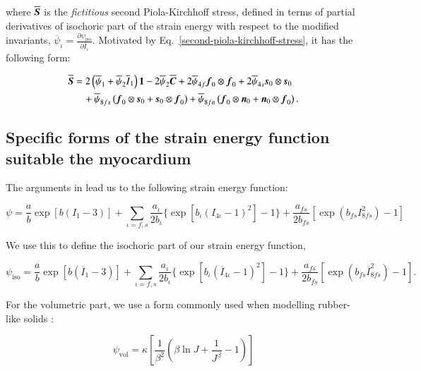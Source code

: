 \noindent where $\overline{\mbox{\boldmath$ S$}}$ is the {\em fictitious} second
Piola-Kirchhoff stress, defined in terms of partial derivatives of
isochoric part of the strain energy with respect to the modified
invariants, $\overline{\psi}_{\iota} = \frac{\partial
  \psi_{\mathrm{iso}}}{\partial \overline{I}_{\iota}}$. Motivated by
Eq.~\ref{second-piola-kirchhoff-stress}, it has the following form:

\begin{equation}
  \begin{split}
    \overline{\mbox{\boldmath$ S$}} &= 2 \left(\overline{\psi}_{1} + \overline{\psi}_{2} \overline{I}_{1} \right) {\bf 1}
                    - 2 \overline{\psi}_{2} \overline{\mbox{\boldmath$ C$}}
                    + 2 \overline{\psi}_{4f} \mbox{\boldmath$ f$}_{0}\otimes\mbox{\boldmath$ f$}_{0}
                    + 2 \overline{\psi}_{4s} \mbox{\boldmath$ s$}_{0}\otimes\mbox{\boldmath$ s$}_{0}\\
            &\quad  + \overline{\psi}_{8fs} \left( \mbox{\boldmath$ f$}_{0}\otimes\mbox{\boldmath$ s$}_{0} + \mbox{\boldmath$ s$}_{0}\otimes\mbox{\boldmath$ f$}_{0} \right)
                    + \overline{\psi}_{8fn} \left( \mbox{\boldmath$ f$}_{0}\otimes\mbox{\boldmath$ n$}_{0} + \mbox{\boldmath$ n$}_{0}\otimes\mbox{\boldmath$ f$}_{0} \right).
  \end{split}
\end{equation}

\subsection{Specific forms of the strain energy function suitable the myocardium}
\label{specific-forms}

The arguments in \citep{Holzapfel:2009bb} lead us to the following
strain energy function:

\begin{equation}
  \psi = \frac{a}{b}\exp[b(I_{1} - 3)]
       + \sum_{\iota=f, s} \frac{a_{\iota}}{2 b_{\iota}}\{\exp\left[b_{\iota}\left(I_{4\iota} - 1\right)^{2}\right] - 1\}
       + \frac{a_{fs}}{2 b_{fs}} \left[\exp\left(b_{fs}I_{8fs}^{2}\right) - 1\right]
\end{equation}

\noindent We use this to define the isochoric part of our strain
energy function,

\begin{equation}
  \psi_{\mathrm{iso}} = \frac{a}{b}\exp[b(\overline{I}_{1} - 3)]
       + \sum_{\iota=f, s} \frac{a_{\iota}}{2 b_{\iota}}\{\exp\left[b_{\iota}\left(\overline{I}_{4\iota} - 1\right)^{2}\right] - 1\}
       + \frac{a_{fs}}{2 b_{fs}} \left[\exp\left(b_{fs}\overline{I}_{8fs}^{2}\right) - 1\right].
\end{equation}

\noindent For the volumetric part, we use a form commonly used when
modelling rubber-like solids \citep{Holzapfel:1996}:

\begin{equation}
  \psi_{\mathrm{vol}} = \kappa \left[\frac{1}{\beta^{2}}\left(\beta\ln J + \frac{1}{J^{\beta}} - 1\right)\right]
\end{equation}



%

